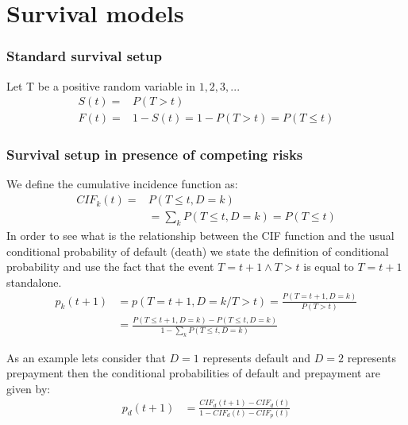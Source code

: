 \chapter{Survival models}
\subsection{Standard survival setup}
Let T be a positive random variable in $1,2,3,...$
\begin{align}
    S(t)=&P(T>t) \\
    F(t)=&1-S(t)=1-P(T>t)=P(T\leq t)
\end{align}
\subsection{Survival setup in presence of competing risks}

We define the cumulative incidence function as:
\begin{align}
    CIF_k(t)=&P(T\leq t,D=k) \\
    &=\sum_k P(T \leq t,D=k) = P(T \leq t)
\end{align}
In order to see what is the relationship between the CIF function and the usual conditional probability of default (death) we state the definition of conditional probability and use the fact that the event $T=t+1 \wedge T>t$ is equal to $T=t+1$ standalone.
\begin{align}
    p_k(t+1)&=p(T=t+1,D=k/T>t)=\frac{P(T=t+1,D=k)}{P(T>t)}\\
    &= \frac{ P(T \leq t+1,D=k)-P(T\leq t,D=k)}{
    1-\sum_k P(T \leq t, D=k)
    }
\end{align}

As an example lets consider that $D=1$ represents default
and $D=2$ represents prepayment then the conditional probabilities of default and prepayment are given by:
\begin{align}
p_d(t+1)&= \frac{CIF_d(t+1)-CIF_d(t)  }{
1- CIF_d(t)-CIF_p(t)}  
\end{align}